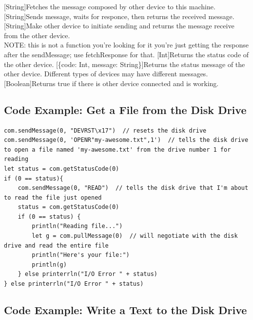 \begin{outline}
\1
\1[String]{Fetches the message composed by other device to this machine.}
\1[String]{Sends message, waits for responce, then returns the received message.}
\1
\1[String]{Make other device to initiate sending and returns the message receive from the other device.\\NOTE: this is not a function you're looking for it you're just getting the response after the sendMessage; use fetchResponse for that.}
\1[Int]{Returns the status code of the other device.}
\1[\{code: Int, message: String\}]{Returns the status message of the other device. Different types of devices may have different messages.}
\1[Boolean]{Returns true if there is other device connected and is working.}
\end{outline}


\subsection{Code Example: Get a File from the Disk Drive}

\begin{lstlisting}
com.sendMessage(0, "DEVRST\x17")  // resets the disk drive
com.sendMessage(0, 'OPENR"my-awesome.txt",1')  // tells the disk drive to open a file named 'my-awesome.txt' from the drive number 1 for reading
let status = com.getStatusCode(0)
if (0 == status){
	com.sendMessage(0, "READ")  // tells the disk drive that I'm about to read the file just opened
	status = com.getStatusCode(0)
	if (0 == status) {
		println("Reading file...")
		let g = com.pullMessage(0)  // will negotiate with the disk drive and read the entire file
		println("Here's your file:")
		println(g)
	} else printerrln("I/O Error " + status)
} else printerrln("I/O Error " + status)
\end{lstlisting}


\subsection{Code Example: Write a Text to the Disk Drive}

